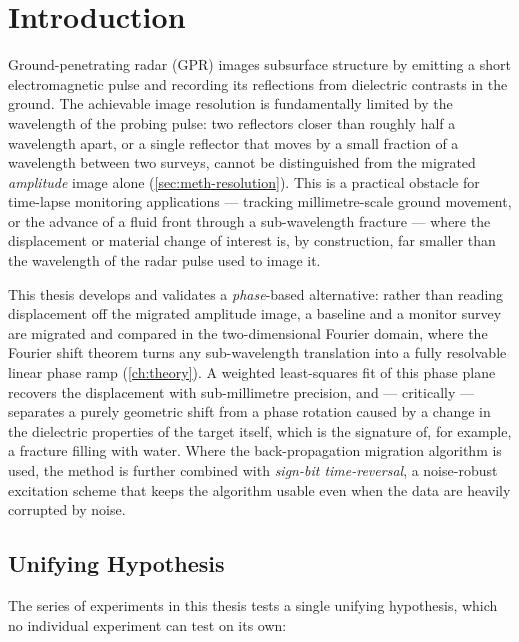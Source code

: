 \chapter{Introduction}
\label{ch:introduction}


Ground-penetrating radar (GPR) images subsurface structure by emitting a
short electromagnetic pulse and recording its reflections from dielectric
contrasts in the ground. The achievable image resolution is fundamentally
limited by the wavelength of the probing pulse: two reflectors closer than
roughly half a wavelength apart, or a single reflector that moves by a small
fraction of a wavelength between two surveys, cannot be distinguished from
the migrated \emph{amplitude} image alone (\cref{sec:meth-resolution}). This
is a practical obstacle for time-lapse monitoring applications --- tracking
millimetre-scale ground movement, or the advance of a fluid front through a
sub-wavelength fracture --- where the displacement or material change of
interest is, by construction, far smaller than the wavelength of the radar
pulse used to image it.

This thesis develops and validates a \emph{phase}-based alternative: rather
than reading displacement off the migrated amplitude image, a baseline and a
monitor survey are migrated and compared in the two-dimensional Fourier
domain, where the Fourier shift theorem turns any sub-wavelength translation
into a fully resolvable linear phase ramp (\cref{ch:theory}). A weighted
least-squares fit of this phase plane recovers the displacement with
sub-millimetre precision, and --- critically --- separates a purely
geometric shift from a phase rotation caused by a change in the dielectric
properties of the target itself, which is the signature of, for example, a
fracture filling with water. Where the back-propagation migration algorithm
is used, the method is further combined with \emph{sign-bit time-reversal},
a noise-robust excitation scheme that keeps the algorithm usable even when
the data are heavily corrupted by noise.

\section*{Unifying Hypothesis}

The series of experiments in this thesis tests a single unifying hypothesis,
which no individual experiment can test on its own:

